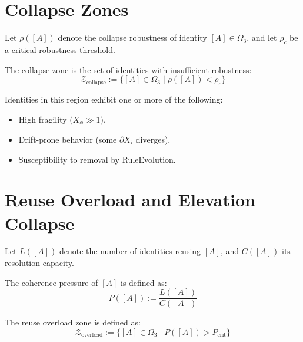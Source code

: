 \section{Collapse Zones} \label{collapse-zones}

Let $\rho([A])$ denote the collapse robustness of identity $[A] \in \Omega_3$, and let $\rho_c$ be a critical robustness threshold.

\begin{definition}
The collapse zone is the set of identities with insufficient robustness:
\begin{equation} \label{eq:collapse-zone}
\mathcal{Z}_{\text{collapse}} := \{ [A] \in \Omega_3 \mid \rho([A]) < \rho_c \}
\end{equation}
\end{definition}

Identities in this region exhibit one or more of the following:
\begin{itemize}
    \item High fragility ($X_\phi \gg 1$),
    \item Drift-prone behavior (some $\partial X_i$ diverges),
    \item Susceptibility to removal by RuleEvolution.
\end{itemize}

\section{Reuse Overload and Elevation Collapse} \label{reuse-overload-and-elevation-collapse}

Let $L([A])$ denote the number of identities reusing $[A]$, and $C([A])$ its resolution capacity.

\begin{definition}
The coherence pressure of $[A]$ is defined as:
\begin{equation} \label{eq:coherence-pressure-reuse}
P([A]) := \frac{L([A])}{C([A])}
\end{equation}
\end{definition}

\begin{definition}
The reuse overload zone is defined as:
\begin{equation} \label{eq:overload-zone}
\mathcal{Z}_{\text{overload}} := \{ [A] \in \Omega_3 \mid P([A]) > P_{\text{crit}} \}
\end{equation}
\end{definition}

